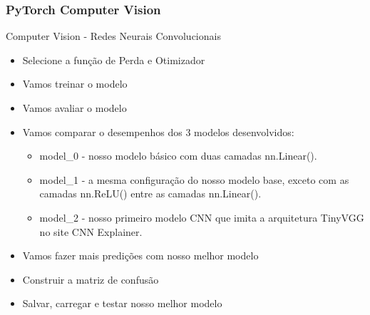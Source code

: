 \documentclass{beamer}
\begin{document}
\begin{frame}
	\frametitle{PyTorch Computer Vision}
	\begin{block}{Computer Vision - Redes Neurais Convolucionais}
		\begin{itemize}
			\item Selecione a função de Perda e Otimizador
			\item Vamos treinar o modelo
			\item Vamos avaliar o modelo
			\item Vamos comparar o desempenhos dos 3 modelos desenvolvidos:
			\begin{itemize}
				\item model\_0 - nosso modelo básico com duas camadas nn.Linear().
				\item model\_1 - a mesma configuração do nosso modelo base, exceto com as camadas nn.ReLU() entre as camadas nn.Linear().
				\item model\_2 - nosso primeiro modelo CNN que imita a arquitetura TinyVGG no site CNN Explainer.
			\end{itemize}
			\item Vamos fazer mais predições com nosso melhor modelo
			\item Construir a matriz de confusão
			\item Salvar, carregar e testar nosso melhor modelo
		\end{itemize}
	\end{block}
\end{frame}


\end{document}
